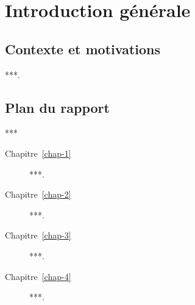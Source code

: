 \chapter*{Introduction générale}
{}

\section*{Contexte et motivations}
***.

\section*{Plan du rapport}
***

\begin{description}
	\item[Chapitre~\ref{chap-1}] ***.
	\item[Chapitre~\ref{chap-2}] ***.
	\item[Chapitre~\ref{chap-3}] ***.
	\item[Chapitre~\ref{chap-4}] ***.
\end{description}